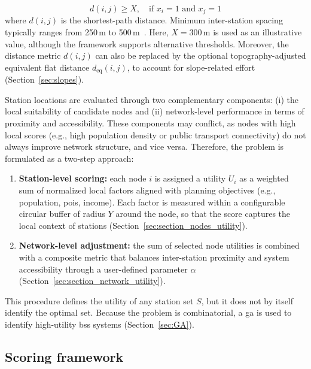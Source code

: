     \begin{equation}\label{eq:spatial_constraint}
        d(i,j) \geq X, \quad \text{if } x_i = 1 \text{ and } x_j = 1
    \end{equation}
    where $d(i,j)$ is the shortest-path distance. Minimum inter-station spacing typically ranges from 250\,m to 500\,m~\cite{Kabak2018, MateoBabiano2016, Croci2014}. Here, $X=300$\,m is used as an illustrative value, although the framework supports alternative thresholds. Moreover, the distance metric $d(i,j)$ can also be replaced by the optional topography-adjusted equivalent flat distance $d_{\mathrm{eq}}(i,j)$, to account for slope-related effort (Section~\ref{sec:slopes}).
    
    Station locations are evaluated through two complementary components: (i) the local suitability of candidate nodes and (ii) network-level performance in terms of proximity and accessibility. These components may conflict, as nodes with high local scores (e.g., high population density or public transport connectivity) do not always improve network structure, and vice versa. Therefore, the problem is formulated as a two-step approach:

    \begin{enumerate}
        \item \textbf{Station-level scoring:} each node \(i\) is assigned a utility \(U_i\) as a weighted sum of normalized local factors aligned with planning objectives (e.g., population, \acp{poi}, income). Each factor is measured within a configurable circular buffer of radius $Y$ around the node, so that the score captures the local context of stations (Section~\ref{sec:section_nodes_utility}).

        \item \textbf{Network-level adjustment:} the sum of selected node utilities is combined with a composite metric that balances inter-station proximity and system accessibility through a user-defined parameter $\alpha$ (Section~\ref{sec:section_network_utility}).
    \end{enumerate}

    This procedure defines the utility of any station set \(S\), but it does not by itself identify the optimal set. Because the problem is combinatorial, a \ac{ga} is used to identify high-utility \ac{bss} systems (Section~\ref{sec:GA}).


\subsection{Scoring framework} \label{sec:section_scoring_framework}

